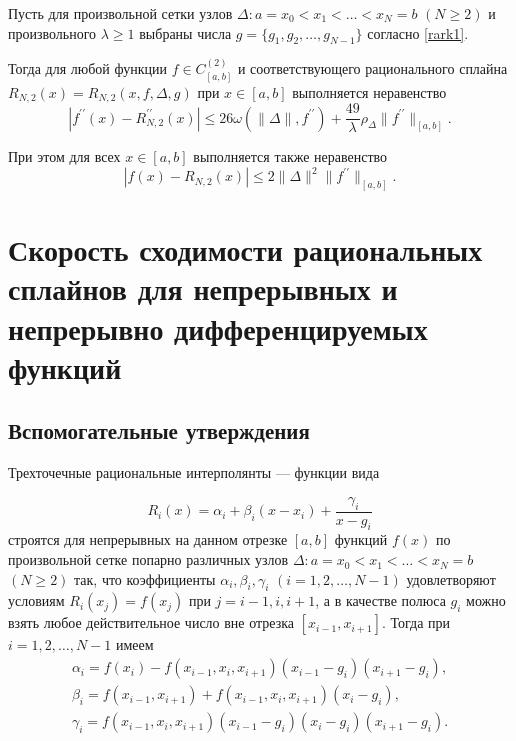 \begin{theorem}\label{rarkteor2}
Пусть для произвольной сетки узлов $\Delta: a=x_0<x_1<\dots<x_N=b$ $(N\geqslant 2)$ и произвольного $\lambda\geqslant 1$
выбраны числа  $g=\{g_1,g_2,\dots,g_{N-1}\}$ согласно \eqref{rark1}.

Тогда для любой функции $f\in C^{(2)}_{[a,b]}$ и соответствующего рационального сплайна
$R_{N,2}(x)=R_{N,2}(x,f,\Delta, g)$ при $x\in[a,b]$ выполняется неравенство
\begin{equation}\label{rark6}
|f^{\prime\prime}(x)-R_{N,2}^{\prime\prime}(x)|\leqslant 26 \omega(\|\Delta\|, f^{\prime\prime})+\frac {49}{\lambda}
\rho_\Delta\|f^{\prime\prime}\|_{[a,b]}.
\end{equation}

При этом для всех $x\in [a,b]$ выполняется также неравенство
\begin{equation}\label{rark7}
|f(x)-R_{N,2}(x)|\leqslant 2\|\Delta\|^2 \|f^{\prime\prime}\|_{[a,b]}.
\end{equation}
 \end{theorem}


\chapter{Скорость сходимости рациональных сплайнов для непрерывных и
 непрерывно дифференцируемых функций}

\section{Вспомогательные утверждения}
Трехточечные рациональные интерполянты --- функции вида

\begin{equation}\label{rark1.1}
R_i(x)=\alpha_i+\beta_i (x-x_i)+\frac{\gamma_i}{x-g_i}
\end{equation}
строятся \cite{rark9} для непрерывных на данном отрезке $[a,b]$ функций $f(x)$
по произвольной сетке попарно различных узлов $\Delta: a=x_0<x_1<\dots<x_N=b$
$(N\geqslant 2)$ так, что коэффициенты $\alpha_i, \beta_i,\gamma_i$ $(i=1,2,\dots,N-1)$
удовлетворяют условиям $R_i(x_j)=f(x_j)$ при $j=i-1,i,i+1$, а в качестве полюса
$g_i$ можно взять любое действительное число вне отрезка $[x_{i-1}, x_{i+1}]$.
Тогда при $i=1,2,\dots,N-1$ имеем
\begin{equation}
\begin{array}{l}
\alpha_i=f(x_i)-f(x_{i-1}, x_i, x_{i+1})(x_{i-1}-g_i)(x_{i+1}-g_i),\\
\beta_i=f(x_{i-1}, x_{i+1})+f(x_{i-1}, x_i, x_{i+1})(x_i-g_i),\\
\gamma_i=f(x_{i-1}, x_i, x_{i+1})(x_{i-1}-g_i)(x_i-g_i)(x_{i+1}-g_i).
\end{array}\label{rark1.2}
\end{equation}

